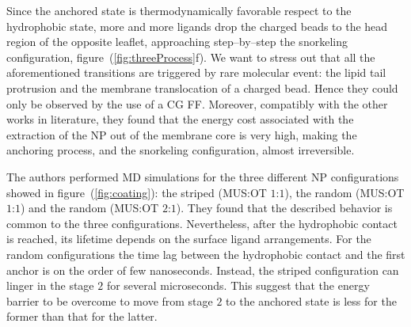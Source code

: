 Since the anchored state is thermodynamically favorable respect to the hydrophobic state, more and more ligands 
drop the charged beads to the head region of the opposite leaflet, approaching step--by--step the snorkeling 
configuration, figure~(\ref{fig:threeProcess}f). We want to stress out that all the aforementioned transitions 
are triggered by rare molecular event: the lipid tail protrusion and the membrane translocation of a charged 
bead. Hence they could only be observed by the use of a \ac{CG} \ac{FF}. Moreover, compatibly with the other 
works in literature, they found that the energy cost associated with the extraction of the \ac{NP} out of the 
membrane core is very high, making the anchoring process, and the snorkeling configuration, almost irreversible.
 
The authors performed \ac{MD} simulations for the three different \ac{NP} configurations showed in 
figure~(\ref{fig:coating}): the striped (\ac{MUS}:\ac{OT} $1$:$1$), the random (\ac{MUS}:\ac{OT} $1$:$1$) and the 
random (\ac{MUS}:\ac{OT} $2$:$1$). They found that the described behavior is common to the three configurations.  
Nevertheless, after the hydrophobic contact is reached, its lifetime depends on the surface ligand arrangements. 
For the random configurations the time lag between the hydrophobic contact and the first anchor is on the order 
of few nanoseconds. Instead, the striped configuration can linger in the stage $2$ for several microseconds. This 
suggest that the energy barrier to be overcome to move from stage $2$ to the anchored state is less for the 
former than that for the latter. 

